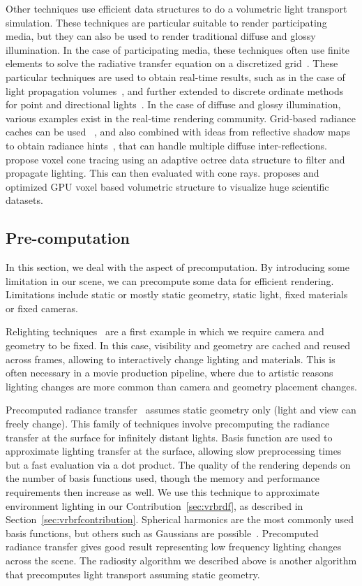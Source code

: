 Other techniques use efficient data structures to do a volumetric light transport simulation. These techniques are particular suitable to render participating media, but they can also be used to render traditional diffuse and glossy illumination. In the case of participating media, these techniques often use finite elements to solve the radiative transfer equation on a discretized grid~\cite{Fattal2009}. These particular techniques are used to obtain real-time results, such as in the case of light propagation volumes~\cite{Kaplanyan2009,Borlum2011}, and further extended to discrete ordinate methods for point and directional lights~\cite{Elek2014}. In the case of diffuse and glossy illumination, various examples exist in the real-time rendering community. Grid-based radiance caches can be used ~\cite{Nijasure2005}, and also combined with ideas from reflective shadow maps to obtain radiance hints~\cite{Papaioannou2011, Vardis2014}, that can handle multiple diffuse inter-reflections.~\citet{Crassin2011} propose voxel cone tracing using an adaptive octree data structure to filter and propagate lighting. This can then evaluated with cone rays. \citet{Hoetzlein2016} proposes and optimized GPU voxel based volumetric structure to visualize huge scientific datasets. 

\subsection{Pre-computation}
In this section, we deal with the aspect of precomputation. By introducing some limitation in our scene, we can precompute some data for efficient rendering. Limitations include static or mostly static geometry, static light, fixed materials or fixed cameras. 

Relighting techniques~\cite{Nimeroff94, Pellacini2005, Hasan2006} are a first example in which we require camera and geometry to be fixed. In this case, visibility and geometry are cached and reused across frames, allowing to interactively change lighting and materials. This is often necessary in a movie production pipeline, where due to artistic reasons lighting changes are more common than camera and geometry placement changes.

Precomputed radiance transfer~\cite{Sloan2002} assumes static geometry only (light and view can freely change). This family of techniques involve precomputing the radiance transfer at the surface for infinitely distant lights. Basis function are used to approximate lighting transfer at the surface, allowing slow preprocessing times but a fast evaluation via a dot product. The quality of the rendering depends on the number of basis functions used, though the memory and performance requirements then increase as well. We use this technique to approximate environment lighting in our Contribution~\ref{sec:vrbrdf}, as described in Section~\ref{sec:vrbrfcontribution}. Spherical harmonics are the most commonly used basis functions, but others such as Gaussians are possible~\cite{Green2006}. Precomputed radiance transfer gives good result representing low frequency lighting changes across the scene. The radiosity algorithm we described above is another algorithm that precomputes light transport assuming static geometry.

